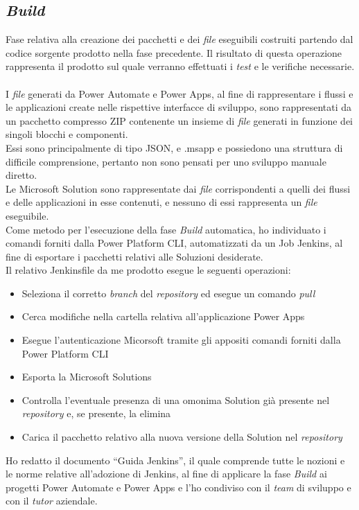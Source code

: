 \subsection{\emph{Build}}
Fase relativa alla creazione dei pacchetti e dei \emph{file} eseguibili costruiti partendo dal codice sorgente prodotto nella fase precedente.
Il risultato di questa operazione rappresenta il prodotto sul quale verranno effettuati i \emph{test} e le verifiche necessarie.\\\\
I \emph{file} generati da Power Automate e Power Apps, al fine di rappresentare i flussi e le applicazioni create nelle rispettive interfacce di sviluppo, sono rappresentati da un pacchetto compresso ZIP contenente un insieme di \emph{file} generati in funzione dei singoli blocchi e componenti.\\
Essi sono principalmente di tipo JSON, e .msapp e possiedono una struttura di difficile comprensione, pertanto non sono pensati per uno sviluppo manuale diretto.\\
Le Microsoft Solution sono rappresentate dai \emph{file} corrispondenti a quelli dei flussi e delle applicazioni in esse contenuti, e nessuno di essi rappresenta un \emph{file} eseguibile.\\
Come metodo per l'esecuzione della fase \emph{Build} automatica, ho individuato i comandi forniti dalla Power Platform CLI, automatizzati da un Job Jenkins, al fine di esportare i pacchetti relativi alle Soluzioni desiderate.\\
Il relativo Jenkinsfile da me prodotto esegue le seguenti operazioni:
\begin{itemize}
    \item Seleziona il corretto \emph{branch} del \emph{repository} ed esegue un comando \emph{pull}
    \item Cerca modifiche nella cartella relativa all'applicazione Power Apps
    \item Esegue l'autenticazione Micorsoft tramite gli appositi comandi forniti dalla Power Platform CLI
    \item Esporta la Microsoft Solutions
    \item Controlla l'eventuale presenza di una omonima Solution già presente nel \emph{repository} e, se presente, la elimina 
    \item Carica il pacchetto relativo alla nuova versione della Solution nel \emph{repository}
\end{itemize}
Ho redatto il documento “Guida Jenkins”, il quale comprende tutte le nozioni e le norme relative all'adozione di Jenkins, al fine di applicare la fase \emph{Build} ai progetti Power Automate e Power Apps e l'ho condiviso con il \emph{team} di sviluppo e con il \emph{\emph{tutor}} aziendale.\\\\


